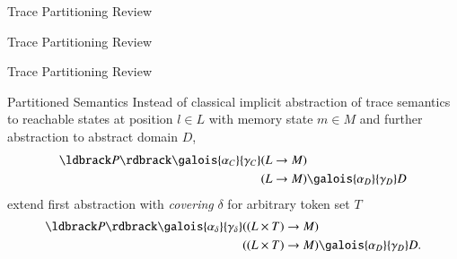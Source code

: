 \documentclass{beamer}
\begin{document}
\begin{section}{Trace Partitioning Review}
\begin{frame}[fragile, t]{Trace Partitioning Review}
\begin{picture}
		\end{picture}
	\end{frame}


	\begin{frame}[t]{Trace Partitioning Review}
		\begin{block}{Partitioned Semantics}
			Instead of classical implicit abstraction of trace semantics  to reachable states at position $l \in L$ with memory state $m \in M$ and further abstraction to abstract domain $D$,
			\begin{align}
				\concrete{P} \galois{\alpha_C}{\gamma_C} & (L \to M)\\
				& (L \to M) \galois{\alpha_D}{\gamma_D}  D 
			\end{align}
			extend first abstraction with \emph{covering} $\delta$ for arbitrary token set $T$
			\begin{align}
				\concrete{P} \galois{\alpha_\delta}{\gamma_\delta} & ((L \times T) \to M)\\
				& ((L \times T) \to M) \galois{\alpha_D}{\gamma_D}  D.
			\end{align}
		\end{block}
	\end{frame}


\end{section}
\end{document}

